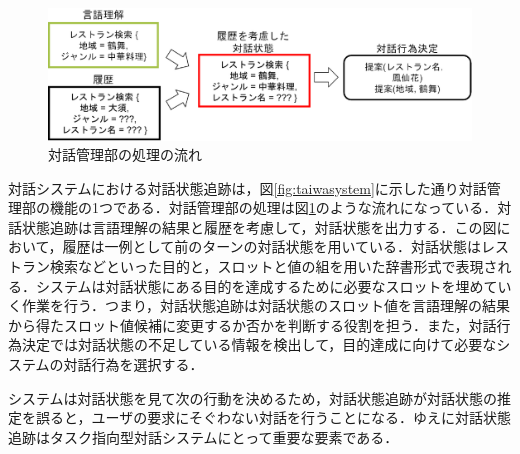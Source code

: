 \begin{figure}[tbh]
    \centering
    \includegraphics[width=15cm]{chapter2/dst2.eps}
    \caption{対話管理部の処理の流れ}
    \label{fig:dst}
\end{figure}

対話システムにおける対話状態追跡は，図\ref{fig:taiwasystem}に示した通り対話管理部の機能の1つである．対話管理部の処理は図\ref{fig:dst}のような流れになっている．対話状態追跡は言語理解の結果と履歴を考慮して，対話状態を出力する．この図において，履歴は一例として前のターンの対話状態を用いている．対話状態はレストラン検索などといった目的と，スロットと値の組を用いた辞書形式で表現される．システムは対話状態にある目的を達成するために必要なスロットを埋めていく作業を行う．つまり，対話状態追跡は対話状態のスロット値を言語理解の結果から得たスロット値候補に変更するか否かを判断する役割を担う．また，対話行為決定では対話状態の不足している情報を検出して，目的達成に向けて必要なシステムの対話行為を選択する．
\par
システムは対話状態を見て次の行動を決めるため，対話状態追跡が対話状態の推定を誤ると，ユーザの要求にそぐわない対話を行うことになる．ゆえに対話状態追跡はタスク指向型対話システムにとって重要な要素である．